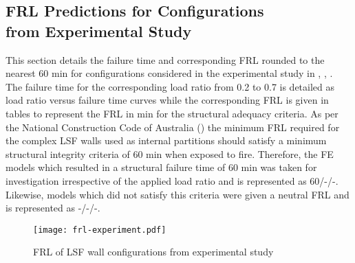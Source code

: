 \subsection[FRL Predictions for Configurations from Experimental Study]{FRL Predictions for Configurations \\from Experimental Study}

This section details the failure time and corresponding FRL rounded to the nearest 60 min for configurations considered in the experimental study in , , . The failure time for the corresponding load ratio from 0.2 to 0.7 is detailed as load ratio versus failure time curves while the corresponding FRL is given in tables to represent the FRL in min for the structural adequacy criteria. As per the National Construction Code of Australia (\citet{ncc2019}) the minimum FRL required for the complex LSF walls used as internal partitions should satisfy a minimum structural integrity criteria of 60 min when exposed to fire. Therefore, the FE models which resulted in a structural failure time of 60 min was taken for investigation irrespective of the applied load ratio and is represented as 60/-/-. Likewise, models which did not satisfy this criteria were given a neutral FRL and is represented as -/-/-.   
\begin{figure}[!htbp]
	\centering
	\texttt{[image: frl-experiment.pdf]}
	\caption{FRL of LSF wall configurations from experimental study}
	\label{fig:frl-experiment}
\end{figure}

